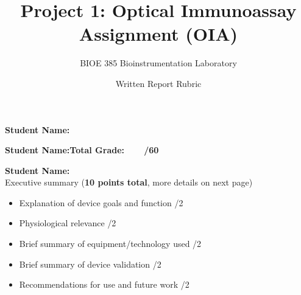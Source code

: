 \documentclass{article}
\title{Project 1: Optical Immunoassay Assignment (OIA)}
\author{BIOE 385 Bioinstrumentation Laboratory}
\date{Written Report Rubric}
\begin{document}
\large
\maketitle

\textbf{Student Name:}\vspace{0.5cm}

\textbf{Student Name:}\hfill 	\textbf{Total Grade:\ \ \ \ \underline{\hspace{1cm}}/60}\vspace{0.5cm}

\textbf{Student Name:}\hfill\\

Executive summary (\textbf{10 points total}, more details on next page)
\begin{small}
\begin{itemize}
	\item Explanation of device goals and function \hfill \underline{\hspace{1cm}}/2
	\item Physiological relevance \hfill \underline{\hspace{1cm}}/2
	\item Brief summary of equipment/technology used \hfill \underline{\hspace{1cm}}/2
	\item Brief summary of device validation \hfill \underline{\hspace{1cm}}/2
	\item Recommendations for use and future work \hfill \underline{\hspace{1cm}}/2
\end{itemize}
\end{small}\
\end{document}
